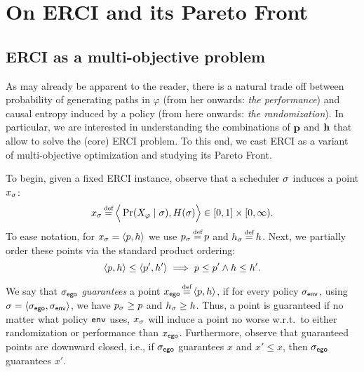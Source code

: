 \section{On ERCI and its Pareto Front}\label{sec:convex}
\subsection{ERCI as a multi-objective problem}
As may already be apparent to the reader, there is a natural trade off
between probability of generating paths in $\varphi$ (from her
onwards: \emph{the performance}) and causal entropy induced by a
policy (from here onwards: \emph{the randomization}).  In particular,
we are interested in understanding the combinations of $\mathbf{p}$
and $\mathbf{h}$ that allow to solve the (core) ERCI problem. To this
end, we cast ERCI as a variant of multi-objective optimization and
studying its Pareto Front.

To begin, given a fixed ERCI instance, observe that a scheduler $\sigma$
induces a point $x_\sigma$:
\begin{equation}
  x_\sched \eqdef \Big\langle \Pr(X_\varphi \mid \sched), H(\sched) \Big\rangle \in [0,1] \times [0,\infty).  
\end{equation}
To ease notation, for $x_\sigma = \langle p,h \rangle$ we use
$\scp_\sched \eqdef \scp$ and $\rndp_\sched \eqdef \rndp$. Next, we
partially order these points via the standard product ordering:
\begin{equation}
  \langle p,h \rangle \leq \langle p',h' \rangle \implies p \leq p' \wedge h \leq h'.
\end{equation}

We say that ${\sigma_{\mathsf{ego}}}$ \emph{guarantees} a point $x_\pOne \eqdef
\langle \scp, \rndp \rangle$, if for every policy ${\sigma_{\mathsf{env}}}$, using
$\sigma = \langle {\sigma_{\mathsf{ego}}}, {\sigma_{\mathsf{env}}} \rangle$, we have
$p_\sigma \geq p$ and $h_\sigma \geq h$. Thus, a point
is guaranteed if no matter what policy $\mathsf{env}$ uses, $x_\sigma$ will
induce a point no worse w.r.t.\ to either randomization or performance
than $x_{\mathsf{ego}}$. Furthermore, observe that guaranteed points are
downward closed, i.e., if ${\sigma_{\mathsf{ego}}}$ guarantees $x$ and $x' \leq x$,
then ${\sigma_{\mathsf{ego}}}$ guarantees $x'$.

\begin{example}
	
\end{example}

